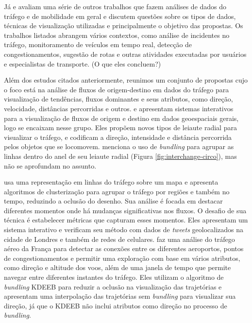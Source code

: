   Já \citet{Andrienko2017Visual} e \citet{Chen2015} avaliam uma série de outros
trabalhos que fazem análises de dados do tráfego e de mobilidade em geral e
discutem questões sobre os tipos de dados, técnicas de visualização utilizadas
e principalmente o objetivo das propostas. Os trabalhos listados abrangem
vários contextos, como análise de incidentes no tráfego, monitoramento de
veículos em tempo real, detecção de congestionamentos, sugestão de rotas e
outras atividades executadas por usuários e especialistas de transporte. (O que
eles concluem?)

  Além dos estudos citados anteriormente, reunimos um conjunto de propostas
cujo o foco está na análise de fluxos de origem-destino em dados do tráfego
para visualização de tendências, fluxos dominantes e seus atributos, como
direção, velocidade, distâncias percorridas e outros.  \citet{Zeng2013} e
\citet{Andrienko2017}  apresentam sistemas interativos para a visualização de
fluxos de origem e destino em dados geoespaciais gerais, logo se encaixam nesse
grupo. Eles propõem novos tipos de leiaute radial para visualizar o tráfego, e
codificam a direção, intensidade e distância percorrida pelos objetos que se
locomovem. \citet{Zeng2013} menciona o uso de \emph{bundling} para agrupar as
linhas dentro do anel de seu leiaute radial (Figura
\ref{fig:interchange-circo}), mas não se aprofundam no assunto. 

 \citet{Landersberg2016} usa uma representação em linhas do tráfego sobre um
mapa e apresenta algoritmos de clusterização para agrupar o tráfego por regiões
e também no tempo, reduzindo a oclusão do desenho. Sua análise é focada em destacar diferentes momentos onde há
mudanças significativas nos fluxos. O desafio de sua técnica é estabelecer métricas
que capturam esses momentos.  Eles apresentam um sistema interativo e
verificam seu método com dados de \emph{tweets} geolocalizados na cidade de Londres e
também de redes de celulares. \citet{Klein2014} faz uma análise do tráfego aéreo
da França para detectar as conexões entre os diferentes aeroportos, pontos de
congestionamentos e permitir uma exploração com base em vários atributos, como
direção e altitude dos voos, além de uma janela de tempo que permite navegar
entre diferentes instantes do tráfego. Eles utilizam o algoritmo de
\emph{bundling} KDEEB para reduzir a oclusão na visualização das trajetórias
e apresentam uma interpolação das trajetórias sem \emph{bundling} para visualizar
sua direção, já que o KDEEB não inclui atributos como direção no processo de \emph{bundling}.

